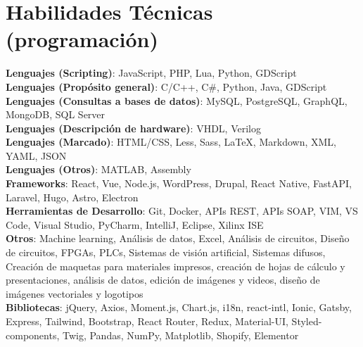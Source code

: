\documentclass[letterpaper,11pt]{article}
\begin{document}
\section{Habilidades Técnicas (programación)}
\begin{itemize}[leftmargin=0.15in, label={}]
  \small{
    \item{\textbf{Lenguajes (Scripting)}{: JavaScript, PHP, Lua, Python, GDScript} \\
    \textbf{Lenguajes (Propósito general)}{: C/C++, C\#, Python, Java, GDScript} \\
    \textbf{Lenguajes (Consultas a bases de datos)}{: MySQL, PostgreSQL, GraphQL, MongoDB, SQL Server} \\
    \textbf{Lenguajes (Descripción de hardware)}{: VHDL, Verilog} \\
    \textbf{Lenguajes (Marcado)}{: HTML/CSS, Less, Sass, LaTeX, Markdown, XML, YAML, JSON} \\
    \textbf{Lenguajes (Otros)}{: MATLAB, Assembly} \\
    \textbf{Frameworks}{: React, Vue, Node.js, WordPress, Drupal, React Native, FastAPI, Laravel, Hugo, Astro, Electron} \\
    \textbf{Herramientas de Desarrollo}{: Git, Docker, APIs REST, APIs SOAP, VIM, VS Code, Visual Studio, PyCharm, IntelliJ, Eclipse, Xilinx ISE} \\
    \textbf{Otros}{: Machine learning, Análisis de datos, Excel, Análisis de circuitos, Diseño de circuitos, FPGAs, PLCs, Sistemas de visión artificial, Sistemas difusos, Creación de maquetas para materiales impresos, creación de hojas de cálculo y presentaciones, análisis de datos, edición de imágenes y videos, diseño de imágenes vectoriales y logotipos} \\
    \textbf{Bibliotecas}{: jQuery, Axios, Moment.js, Chart.js, i18n, react-intl, Ionic, Gatsby, Express, Tailwind, Bootstrap, React Router, Redux, Material-UI, Styled-components, Twig, Pandas, NumPy, Matplotlib, Shopify, Elementor}
    }
  }
\end{itemize}
\end{document}
